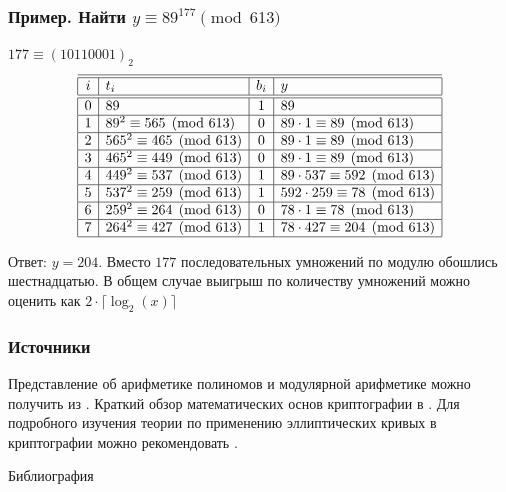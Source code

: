 \begin{frame}
    \frametitle{Пример. Найти $y\equiv 89^{177}\pmod{613}$}

    $177 \equiv (10110001)_2$
    \[
        \begin{array}[c]{|c|l|c|l|}
            \hline\hline
            i & t_i & b_i & y\\
            \hline\hline
            0&89&1&89\\
            \hline
            1&89^2\equiv 565\pmod{613}&0&89\cdot 1\equiv 89\pmod{613}\\
            \hline
            2&565^2\equiv 465\pmod{613}&0&89\cdot 1\equiv 89\pmod{613}\\
            \hline
            3&465^2\equiv 449\pmod{613}&0&89\cdot 1\equiv 89\pmod{613}\\
            \hline
            4&449^2\equiv 537\pmod{613}&1&89\cdot 537\equiv 592\pmod{613}\\
            \hline
            5&537^2\equiv 259\pmod{613}&1&592\cdot 259\equiv78\pmod{613}\\
            \hline
            6&259^2\equiv 264\pmod{613}&0&78\cdot 1\equiv 78\pmod{613}\\
            \hline
            7&264^2\equiv 427\pmod{613}&1&78\cdot 427\equiv 204\pmod{613}\\
            \hline
        \end{array}
    \]

    Ответ: $y=204$. Вместо $177$ последовательных умножений по модулю обошлись шестнадцатью. В общем случае выигрыш по количеству умножений можно оценить как $2\cdot \lceil\log_2(x)\rceil$
\end{frame}

\begin{frame}
    \frametitle{Источники}
    
    Представление об арифметике полиномов и модулярной арифметике можно получить из \cite{bib:knuth:artOfProgramming2}.
    Краткий обзор математических основ криптографии в \cite{bib:smart:crypto, bib:mao:modernCrypto}.
    Для подробного изучения теории по применению эллиптических кривых в криптографии можно рекомендовать \cite{bib:bolotov:elliptic}.
\end{frame}


\begin{frame}[allowframebreaks]{Библиография}
    
    
\end{frame}

